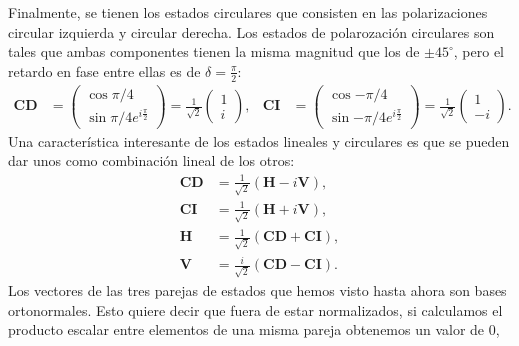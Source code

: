 Finalmente, se tienen los estados circulares que consisten en las
polarizaciones circular izquierda y circular derecha. Los estados de
polarozación circulares son tales que
ambas componentes tienen la misma magnitud que los de $\pm45^{\circ}$,
pero el retardo en fase entre ellas es de $\delta = \frac{\pi}{2}$:
\begin{align*}
\mathbf{CD}
&=\begin{pmatrix}\cos{\pi/4}\\\sin{\pi/4}e^{i\frac{\pi}{2}}\end{pmatrix}=\frac{1}{\sqrt{2}}
\begin{pmatrix}1\\i\end{pmatrix},&
\mathbf{CI} 
&=\begin{pmatrix}\cos{-\pi/4}\\\sin{-\pi/4}e^{i\frac{\pi}{2}}\end{pmatrix}=\frac{1}{\sqrt{2}}\begin{pmatrix}1\\-i\end{pmatrix}. 
\end{align*} 
Una característica interesante de los estados lineales y circulares es
que se pueden dar unos como combinación lineal de los otros:
\begin{align*}
\mathbf{CD} &= \frac{1}{\sqrt{2}}\left( \mathbf{H} -
  i\mathbf{V}\right),\\
\mathbf{CI} &= \frac{1}{\sqrt{2}}\left( \mathbf{H} +
  i\mathbf{V}\right),\\
\mathbf{H} &= \frac{1}{\sqrt{2}}\left( \mathbf{CD} +
  \mathbf{CI}\right),\\
\mathbf{V} &= \frac{i}{\sqrt{2}}\left( \mathbf{CD} -
  \mathbf{CI}\right).
\end{align*}
Los vectores de las tres parejas de estados que hemos visto hasta
ahora son bases
ortonormales. Esto quiere decir que fuera de estar normalizados,
si calculamos el producto escalar entre elementos de una misma pareja obtenemos un
valor de 0,
